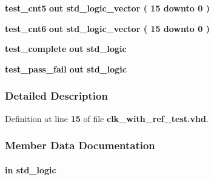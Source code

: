 \begin{DoxyCompactItemize}
\item 
{\bf test\+\_\+cnt5}  {\bfseries {\bfseries \textcolor{keywordflow}{out}\textcolor{vhdlchar}{ }}} {\bfseries \textcolor{comment}{std\+\_\+logic\+\_\+vector}\textcolor{vhdlchar}{ }\textcolor{vhdlchar}{(}\textcolor{vhdlchar}{ }\textcolor{vhdlchar}{ } \textcolor{vhdldigit}{15} \textcolor{vhdlchar}{ }\textcolor{keywordflow}{downto}\textcolor{vhdlchar}{ }\textcolor{vhdlchar}{ } \textcolor{vhdldigit}{0} \textcolor{vhdlchar}{ }\textcolor{vhdlchar}{)}\textcolor{vhdlchar}{ }} 
\item 
{\bf test\+\_\+cnt6}  {\bfseries {\bfseries \textcolor{keywordflow}{out}\textcolor{vhdlchar}{ }}} {\bfseries \textcolor{comment}{std\+\_\+logic\+\_\+vector}\textcolor{vhdlchar}{ }\textcolor{vhdlchar}{(}\textcolor{vhdlchar}{ }\textcolor{vhdlchar}{ } \textcolor{vhdldigit}{15} \textcolor{vhdlchar}{ }\textcolor{keywordflow}{downto}\textcolor{vhdlchar}{ }\textcolor{vhdlchar}{ } \textcolor{vhdldigit}{0} \textcolor{vhdlchar}{ }\textcolor{vhdlchar}{)}\textcolor{vhdlchar}{ }} 
\item 
{\bf test\+\_\+complete}  {\bfseries {\bfseries \textcolor{keywordflow}{out}\textcolor{vhdlchar}{ }}} {\bfseries \textcolor{comment}{std\+\_\+logic}\textcolor{vhdlchar}{ }} 
\item 
{\bf test\+\_\+pass\+\_\+fail}  {\bfseries {\bfseries \textcolor{keywordflow}{out}\textcolor{vhdlchar}{ }}} {\bfseries \textcolor{comment}{std\+\_\+logic}\textcolor{vhdlchar}{ }} 
\end{DoxyCompactItemize}


\subsubsection{Detailed Description}


Definition at line {\bf 15} of file {\bf clk\+\_\+with\+\_\+ref\+\_\+test.\+vhd}.



\subsubsection{Member Data Documentation}
\paragraph[{clk0}]{ {\bfseries \textcolor{keywordflow}{in}\textcolor{vhdlchar}{ }} {\bfseries \textcolor{comment}{std\+\_\+logic}\textcolor{vhdlchar}{ }} \hspace{0.3cm}{\ttfamily [Port]}}\label{classclk__with__ref__test_a33d06d61ee0866ec1b46baeea077be1b}


